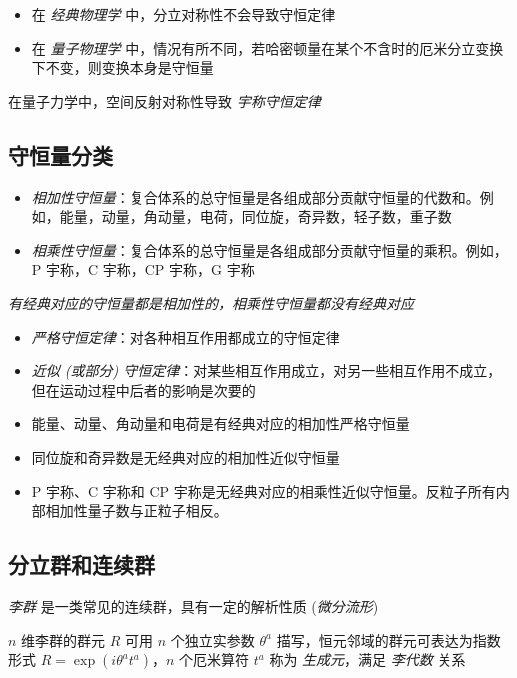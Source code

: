 \begin{itemize}
    \item 在 \emph{经典物理学} 中，分立对称性不会导致守恒定律
    \item 在 \emph{量子物理学} 中，情况有所不同，若哈密顿量在某个不含时的厄米分立变换下不变，则变换本身是守恒量
\end{itemize}

在量子力学中，空间反射对称性导致 \emph{宇称守恒定律}

\subsection{守恒量分类}

\begin{itemize}
    \item \emph{相加性守恒量}：复合体系的总守恒量是各组成部分贡献守恒量的代数和。例如，能量，动量，角动量，电荷，同位旋，奇异数，轻子数，重子数
    \item \emph{相乘性守恒量}：复合体系的总守恒量是各组成部分贡献守恒量的乘积。例如，P 宇称，C 宇称，CP 宇称，G 宇称
\end{itemize}

\emph{有经典对应的守恒量都是相加性的，相乘性守恒量都没有经典对应}

\begin{itemize}
    \item \emph{严格守恒定律}：对各种相互作用都成立的守恒定律
    \item \emph{近似 (或部分) 守恒定律}：对某些相互作用成立，对另一些相互作用不成立，但在运动过程中后者的影响是次要的
\end{itemize}

\begin{itemize}
    \item 能量、动量、角动量和电荷是有经典对应的相加性严格守恒量
    \item 同位旋和奇异数是无经典对应的相加性近似守恒量
    \item P 宇称、C 宇称和 CP 宇称是无经典对应的相乘性近似守恒量。反粒子所有内部相加性量子数与正粒子相反。
\end{itemize}

\subsection{分立群和连续群}

\emph{李群} 是一类常见的连续群，具有一定的解析性质 (\emph{微分流形})

$n$ 维李群的群元 $R$ 可用 $n$ 个独立实参数 $\theta^a$ 描写，恒元邻域的群元可表达为指数形式 $R=\exp(i\theta^a t^a)$，$n$ 个厄米算符 $t^a$ 称为 \emph{生成元}，满足 \emph{李代数} 关系

